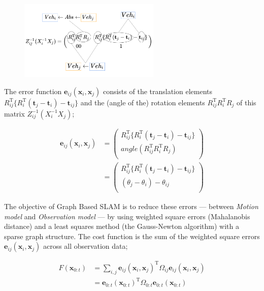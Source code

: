 \documentclass{article}
\begin{document}
\begin{figure}[h!]
  \centering
  \includegraphics[width=0.6\textwidth]{3-2_error_between_edges.png}
\end{figure}

\newpage

The error function $\bm{e}_{ij}(\bm{x}_i, \bm{x}_j)$ consists of the translation elements $R_{ij}^{\mathrm{T}}\{R_i^{\mathrm{T}}(\bm{t}_j-\bm{t}_i)-\bm{t}_{ij}\}$ and the (angle of the) rotation elements $R_{ij}^{\mathrm{T}}R_i^{\mathrm{T}}R_j$ of this matrix $Z_{ij}^{-1} (X_i^{-1} X_j)$;

\[
\begin{align}
\bm{e}_{ij}(\bm{x}_i, \bm{x}_j) &=
\left(
  \begin{array}{cc}
    R_{ij}^{\mathrm{T}}\{R_i^{\mathrm{T}}(\bm{t}_j-\bm{t}_i)-\bm{t}_{ij}\} \\
                                   angle(R_{ij}^{\mathrm{T}}R_i^{\mathrm{T}}R_j) \\
  \end{array}
\right) \\ &=
\left(
  \begin{array}{cc}
    R_{ij}^{\mathrm{T}}\{R_i^{\mathrm{T}}(\bm{t}_j-\bm{t}_i)-\bm{t}_{ij}\} \\
                                             (\theta_j - \theta_i) - \theta_{ij} \\
  \end{array}
\right)
\end{align}
\]

The objective of Graph Based SLAM is to reduce these errors --- between \textit{Motion model} and \textit{Observation model} --- by using weighted square errors (Mahalanobis distance) and a least squares method (the Gauss-Newton algorithm) with a sparse graph structure.
The cost function is the sum of the weighted square errors $\bm{e}_{ij}(\bm{x}_i, \bm{x}_j)$ across all observation data;

\[
\begin{align}
F(\bm{x}_{0:t}) &=
\sum_{i,j} \bm{e}_{ij}(\bm{x}_i, \bm{x}_j)^{\mathrm{T}} \Omega_{ij} \bm{e}_{ij}(\bm{x}_i, \bm{x}_j) \\ &=
\bm{e}_{0:t}(\bm{x}_{0:t})^{\mathrm{T}} \Omega_{0:t} \bm{e}_{0:t}(\bm{x}_{0:t})
\end{align}
\]
\end{document}
